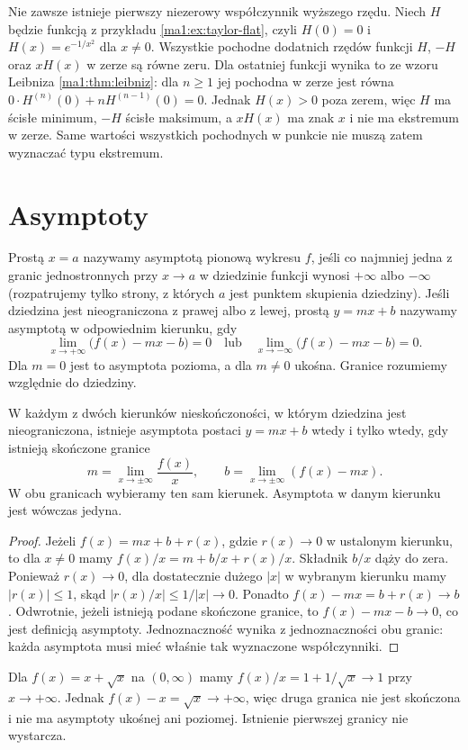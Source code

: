 \begin{przyklad}
\label{ma1:ex:flat-extrema}
Nie zawsze istnieje pierwszy niezerowy współczynnik wyższego rzędu. Niech $H$ będzie funkcją z przykładu \ref{ma1:ex:taylor-flat}, czyli $H(0)=0$ i $H(x)=e^{-1/x^2}$ dla $x\ne0$. Wszystkie pochodne dodatnich rzędów funkcji $H$, $-H$ oraz $xH(x)$ w zerze są równe zeru. Dla ostatniej funkcji wynika to ze wzoru Leibniza \ref{ma1:thm:leibniz}: dla $n\ge1$ jej pochodna w zerze jest równa $0\cdot H^{(n)}(0)+nH^{(n-1)}(0)=0$. Jednak $H(x)>0$ poza zerem, więc $H$ ma ścisłe minimum, $-H$ ścisłe maksimum, a $xH(x)$ ma znak $x$ i nie ma ekstremum w zerze. Same wartości wszystkich pochodnych w punkcie nie muszą zatem wyznaczać typu ekstremum.
\end{przyklad}

\section{Asymptoty}
\begin{definicja}
\label{ma1:def:asymptotes}
Prostą $x=a$ nazywamy asymptotą pionową wykresu $f$, jeśli co najmniej jedna z granic jednostronnych przy $x\to a$ w dziedzinie funkcji wynosi $+\infty$ albo $-\infty$ (rozpatrujemy tylko strony, z których $a$ jest punktem skupienia dziedziny).
Jeśli dziedzina jest nieograniczona z prawej albo z lewej, prostą $y=mx+b$ nazywamy asymptotą w odpowiednim kierunku, gdy
\[
 \lim_{x\to+\infty}\bigl(f(x)-mx-b\bigr)=0
 \quad\text{lub}\quad
 \lim_{x\to-\infty}\bigl(f(x)-mx-b\bigr)=0.
\]
Dla $m=0$ jest to asymptota pozioma, a dla $m\ne0$ ukośna. Granice rozumiemy względnie do dziedziny.
\end{definicja}
\begin{stwierdzenie}
\label{ma1:prop:asymptote-coefficients}
W każdym z dwóch kierunków nieskończoności, w którym dziedzina jest nieograniczona, istnieje asymptota postaci $y=mx+b$ wtedy i tylko wtedy, gdy istnieją skończone granice
\[
 m=\lim_{x\to\pm\infty}\frac{f(x)}x,\qquad
 b=\lim_{x\to\pm\infty}(f(x)-mx).
\]
W obu granicach wybieramy ten sam kierunek. Asymptota w danym kierunku jest wówczas jedyna.
\end{stwierdzenie}
\begin{proof}
Jeżeli $f(x)=mx+b+r(x)$, gdzie $r(x)\to0$ w ustalonym kierunku, to dla $x\ne0$ mamy $f(x)/x=m+b/x+r(x)/x$. Składnik $b/x$ dąży do zera. Ponieważ $r(x)\to0$, dla dostatecznie dużego $|x|$ w wybranym kierunku mamy $|r(x)|\le1$, skąd $|r(x)/x|\le1/|x|\to0$. Ponadto $f(x)-mx=b+r(x)\to b$. Odwrotnie, jeżeli istnieją podane skończone granice, to $f(x)-mx-b\to0$, co jest definicją asymptoty. Jednoznaczność wynika z jednoznaczności obu granic: każda asymptota musi mieć właśnie tak wyznaczone współczynniki.
\end{proof}
\begin{przyklad}
\label{ma1:ex:asymptote-slope-only}
Dla $f(x)=x+\sqrt{x}$ na $(0,\infty)$ mamy $f(x)/x=1+1/\sqrt{x}\to1$ przy $x\to+\infty$. Jednak $f(x)-x=\sqrt{x}\to+\infty$, więc druga granica nie jest skończona i nie ma asymptoty ukośnej ani poziomej. Istnienie pierwszej granicy nie wystarcza.
\end{przyklad}

